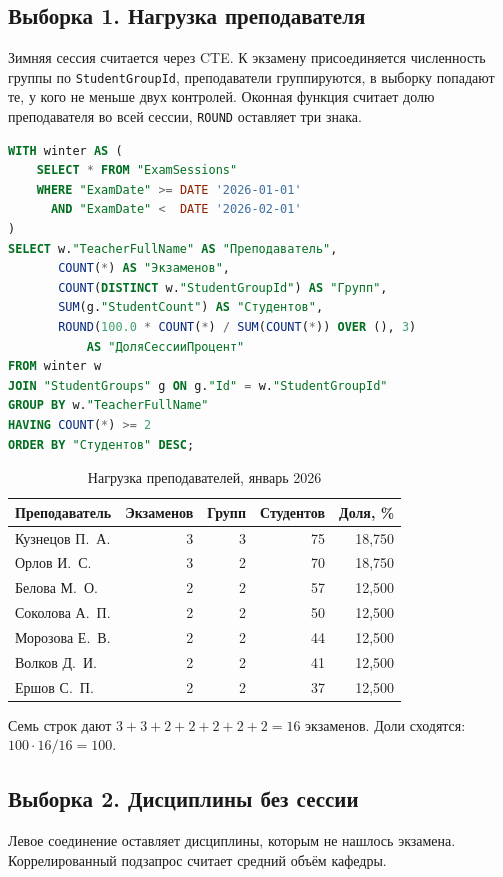 \documentclass[12pt,a4paper]{article}
\begin{document}
\subsection*{Выборка 1. Нагрузка преподавателя}
Зимняя сессия считается через CTE. К экзамену присоединяется численность группы по \texttt{StudentGroupId}, преподаватели группируются, в выборку попадают те, у кого не меньше двух контролей. Оконная функция считает долю преподавателя во всей сессии, \texttt{ROUND} оставляет три знака.

\begin{lstlisting}[language=SQL]
WITH winter AS (
    SELECT * FROM "ExamSessions"
    WHERE "ExamDate" >= DATE '2026-01-01'
      AND "ExamDate" <  DATE '2026-02-01'
)
SELECT w."TeacherFullName" AS "Преподаватель",
       COUNT(*) AS "Экзаменов",
       COUNT(DISTINCT w."StudentGroupId") AS "Групп",
       SUM(g."StudentCount") AS "Студентов",
       ROUND(100.0 * COUNT(*) / SUM(COUNT(*)) OVER (), 3)
           AS "ДоляСессииПроцент"
FROM winter w
JOIN "StudentGroups" g ON g."Id" = w."StudentGroupId"
GROUP BY w."TeacherFullName"
HAVING COUNT(*) >= 2
ORDER BY "Студентов" DESC;
\end{lstlisting}

\begin{table}[H]
\centering
\caption{Нагрузка преподавателей, январь 2026}
\small
\begin{tabular}{lrrrr}
\toprule
Преподаватель & Экзаменов & Групп & Студентов & Доля, \% \\
\midrule
Кузнецов П.~А. & 3 & 3 & 75 & 18,750 \\
Орлов И.~С. & 3 & 2 & 70 & 18,750 \\
Белова М.~О. & 2 & 2 & 57 & 12,500 \\
Соколова А.~П. & 2 & 2 & 50 & 12,500 \\
Морозова Е.~В. & 2 & 2 & 44 & 12,500 \\
Волков Д.~И. & 2 & 2 & 41 & 12,500 \\
Ершов С.~П. & 2 & 2 & 37 & 12,500 \\
\bottomrule
\end{tabular}
\end{table}
Семь строк дают \(3+3+2+2+2+2+2=16\) экзаменов. Доли сходятся: \(100\cdot16/16=100\).

\subsection*{Выборка 2. Дисциплины без сессии}
Левое соединение оставляет дисциплины, которым не нашлось экзамена. Коррелированный подзапрос считает средний объём кафедры.
\end{document}
